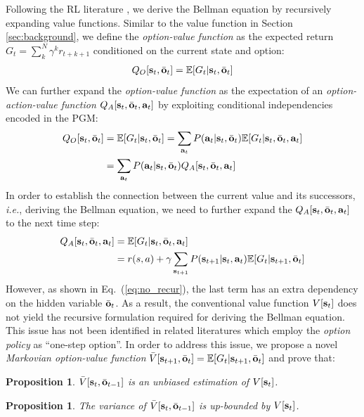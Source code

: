 \documentclass[10pt,journal,compsoc]{IEEEtran}
\renewcommand{\cite}{\citep}
\newtheorem{prop}[thm]{Proposition}
\begin{document}
Following the RL literature \cite{sutton2018reinforcement}, we
derive the Bellman equation by recursively expanding value
functions. Similar to the value function in Section
\ref{sec:background}, we define the \emph{option-value function}
as the expected return $G_t = \sum_k^N\gamma^kr_{t+k+1}$
conditioned on the current state and option:
\begin{align}
  \label{eq:sa_q_o}
  Q_O[\rvs_t,\bar{\rvo}_{t}]=\E[G_t|\rvs_t,\bar{\rvo}_{t}]
\end{align}
We can further expand the \emph{option-value function} as the
expectation of an \emph{option-action-value function} $Q_A[
{\mathbf{s}}_t,\bar{{\mathbf{o}}}_t,{\mathbf{a}}_t]$ by exploiting conditional
independencies encoded in the PGM:
\begin{align}
\label{eq:sa_q_a}
  Q_O[\rvs_t,\bar{\rvo}_{t}]&=\E[G_t|\rvs_t,\bar{\rvo}_{t}]  =\sum_{\rva_t}P(\rva_t|\rvs_t,\bar{\rvo}_{t})\E[G_t|\rvs_t,\bar{\rvo}_t,\rva_t]\nonumber\\
  &=\sum_{\rva_t}P(\rva_t|\rvs_t,\bar{\rvo}_{t})Q_A[ \rvs_t,\bar{\rvo}_t,\rva_t]
\end{align}
In order to establish the connection between the current value
and its successors, \textit{i.e.}, deriving the Bellman equation, we need
to further expand the $Q_A[ {\mathbf{s}}_t,\bar{{\mathbf{o}}}_t,{\mathbf{a}}_t]$ to the
next time step:
\begin{align}
  \label{eq:no_recur}
  Q_A[ \rvs_t,\bar{\rvo}_t,\rva_t]&=\E[G_t| \rvs_t,\bar{\rvo}_t,\rva_t]\nonumber\\
  &=
  r(s,a) + \gamma\sum_{\rvs_{t+1}}P(\rvs_{t+1}|\rvs_t,\rva_t)\E[G_t|\rvs_{t+1},\bar{\rvo}_t]
\end{align}
However, as shown in Eq.~(\ref{eq:no_recur}), the last term has an
extra dependency on the hidden variable $\bar{{\mathbf{o}}}_t$. As a
result, the conventional value function $V[{\mathbf{s}}_t]$ does not
yield the recursive formulation required for deriving the Bellman
equation. This issue has not been identified in related
literatures
\cite{henderson2018optiongan,sharma2018directed,shankar2020learning,lee2020learning,zhang2019dac}
which employ the \emph{option policy} as ``one-step option''. In
order to address this issue, we propose a novel \emph{Markovian
  option-value function}
$\bar{V}[{\mathbf{s}}_{t+1},\bar{{\mathbf{o}}}_{t}]=\mathbb{E}[G_t|{\mathbf{s}}_{t+1},\bar{{\mathbf{o}}}_t]$
and prove that:
\begin{prop}
  \label{prop:var_unb}
  $\bar{V}[{\mathbf{s}}_t,\bar{{\mathbf{o}}}_{t-1} ]$ is an unbiased estimation
  of $V[ {\mathbf{s}}_t ]$.
\end{prop}
\begin{prop}
  \label{prop:var_red}
  The variance of $\bar{V}[{\mathbf{s}}_t,\bar{{\mathbf{o}}}_{t-1} ]$ is
  up-bounded by $V[ {\mathbf{s}}_t ]$.
\end{prop}
\end{document}
